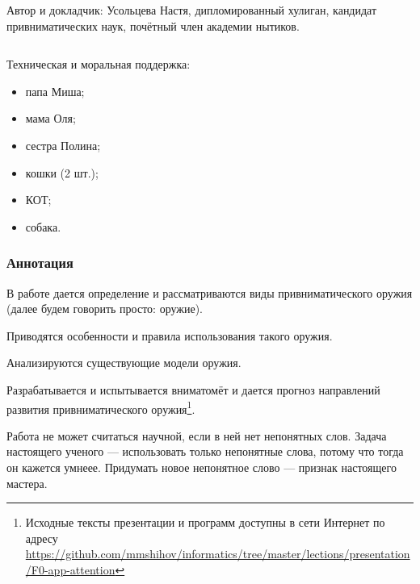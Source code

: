 \begin{frame}
\begin{columns}
            \alert{Автор и докладчик}: Усольцева Настя, дипломированный хулиган, кандидат привниматических наук, почётный член академии нытиков.
    \end{columns}    
    
    \par\bigskip
    
    \alert{Техническая и моральная поддержка}:
    \begin{itemize}
        \item папа Миша;
        \item мама Оля;
        \item сестра Полина;
        \item кошки (2 шт.);
        \item \alert{КОТ};
        \item собака.
    \end{itemize}
    
\end{frame}

\begin{frame}
    \frametitle{Аннотация}
    
    В работе дается определение и рассматриваются виды \alert{привниматического оружия} (далее будем говорить просто: \alert{оружие}). 
    
    \par\bigskip
    
    Приводятся \alert{особенности и правила} использования такого оружия. 
    
    \par\bigskip

    Анализируются \alert{существующие модели} оружия. 

    \par\bigskip
    
    Разрабатывается и испытывается вниматомёт \alert{\myDevice} и дается прогноз направлений развития привниматического оружия\footnote{Исходные тексты презентации и программ доступны в сети Интернет по адресу \url{https://github.com/mmshihov/informatics/tree/master/lections/presentation/F0-app-attention}}.
\end{frame}

Работа не может считаться научной, если в ней нет непонятных слов. Задача настоящего ученого --- использовать только непонятные слова, потому что тогда он кажется умнеее. Придумать новое непонятное слово --- признак настоящего мастера.
    
